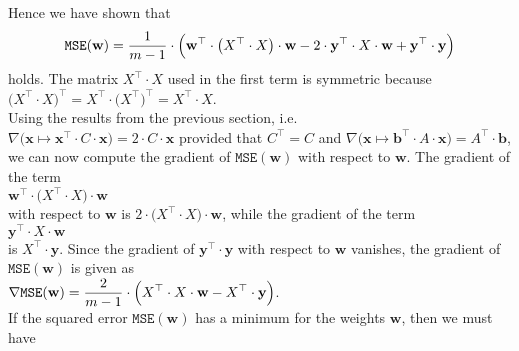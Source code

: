 Hence we have shown that
\begin{equation}
  \label{eq:squared-error-4}
  \mathtt{MSE}(\mathbf{w}) = \displaystyle \frac{1}{m-1} \cdot \Bigl(\mathbf{w}^\top \cdot \bigl(X^\top \cdot X\bigr) \cdot \mathbf{w} 
                                             - 2 \cdot \textbf{y}^\top \cdot X \cdot \mathbf{w} 
                                             + \mathbf{y}^\top \cdot \mathbf{y}
                                        \Bigr)
\end{equation}
holds.  The matrix $X^\top \cdot X$ used in the first term is symmetric because
\\[0.2cm]
\hspace*{1.3cm}
$\bigl(X^\top \cdot X\bigr)^\top = X^\top \cdot \bigl(X^\top\bigr)^\top = X^\top \cdot X$.
\\[0.2cm]
Using the results from the previous section, i.e.~
\\[0.2cm]
\hspace*{1.3cm}
$\nabla \bigl(\mathbf{x} \mapsto \mathbf{x}^\top \cdot C \cdot \mathbf{x}\bigr) = 2 \cdot C \cdot \mathbf{x}$
\quad provided that $C^\top = C$ \quad and \quad
$\nabla \bigl(\mathbf{x} \mapsto \mathbf{b}^\top \cdot A \cdot \mathbf{x}\bigr) = A^\top \cdot \mathbf{b}$,
\\[0.2cm]
we can now compute the gradient of $\mathtt{MSE}(\mathbf{w})$ with respect to
$\mathbf{w}$.  The gradient of the term
\\[0.2cm]
\hspace*{1.3cm}
$\mathbf{w}^\top \cdot \bigl(X^\top \cdot X\bigr) \cdot \mathbf{w}$
\\[0.2cm]
with respect to $\mathbf{w}$ is $2 \cdot \bigl(X^\top \cdot X\bigr) \cdot \mathbf{w}$, while the gradient of
the term 
\\[0.2cm]
\hspace*{1.3cm}
$\textbf{y}^\top \cdot X \cdot \mathbf{w}$
\\[0.2cm]
is $X^\top \cdot \mathbf{y}$.  Since the gradient of $\mathbf{y}^\top \cdot \mathbf{y}$ with respect to
$\mathbf{w}$ vanishes, the gradient of $\mathtt{MSE}(\mathbf{w})$ is given as
\\[0.2cm]
\hspace*{1.3cm}
$\displaystyle \nabla \mathtt{MSE}(\mathbf{w}) = \frac{2}{m-1} \cdot \Bigl(X^\top \cdot X \cdot \mathbf{w} - X^\top \cdot \mathbf{y}\Bigr)$.
\\[0.2cm]
If the squared error $\mathtt{MSE}(\mathbf{w})$ has a minimum for the weights $\mathbf{w}$, then we must have
\\[0.2cm]
